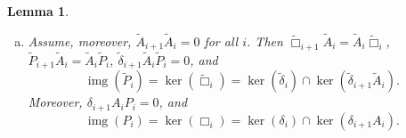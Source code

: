 \documentclass[reqno,12pt]{amsart}
\DeclareMathOperator{\img}{img}
\DeclareMathOperator{\id}{id}
\theoremstyle{plain}
\newtheorem{lemma}[theorem]{Lemma}
\theoremstyle{definition}
\begin{document}
\begin{lemma}
\begin{enumerate}[(a)]
\item
Assume, moreover, $\tilde A_{i+1}\tilde A_i=0$ for all $i$.
Then $\tilde\Box_{i+1}\tilde A_i=\tilde A_i\tilde\Box_i$, $\tilde P_{i+1}\tilde A_i=\tilde A_i\tilde P_i$, $\tilde\delta_{i+1}\tilde A_i\tilde P_i=0$, and 
\begin{equation}\label{E:kertbox}
\img(\tilde P_i)=\ker(\tilde\Box_i)
=\ker(\tilde\delta_i)\cap\ker(\tilde\delta_{i+1}\tilde A_i).
\end{equation}
Moreover, $\delta_{i+1}A_iP_i=0$, and 
\begin{equation}\label{E:kerbox}
\img(P_i)=\ker(\Box_i)=\ker(\delta_i)\cap\ker(\delta_{i+1}A_i).
\end{equation}
\end{enumerate}
\end{lemma}
\end{document}
